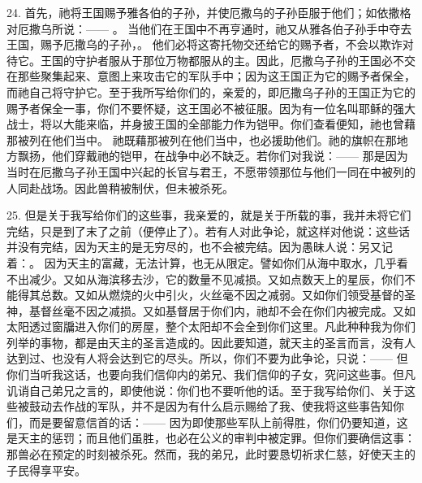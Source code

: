 24. 首先，祂将王国赐予雅各伯的子孙，并使厄撒乌的子孙臣服于他们；如依撒格对厄撒乌所说：—— 。 当他们在王国中不再亨通时，祂又从雅各伯子孙手中夺去王国，赐予厄撒乌的子孙，。 他们必将这寄托物交还给它的赐予者，不会以欺诈对待它。王国的守护者服从于那位万物都服从的主。因此，厄撒乌子孙的王国必不交在那些聚集起来、意图上来攻击它的军队手中；因为这王国正为它的赐予者保全，而祂自己将守护它。至于我所写给你们的，亲爱的，即厄撒乌子孙的王国正为它的赐予者保全一事，你们不要怀疑，这王国必不被征服。因为有一位名叫耶稣的强大战士，将以大能来临，并身披王国的全部能力作为铠甲。你们查看便知，祂也曾藉那被列在他们当中。 祂既藉那被列在他们当中，也必援助他们。祂的旗帜在那地方飘扬，他们穿戴祂的铠甲，在战争中必不缺乏。若你们对我说：—— 那是因为当时在厄撒乌子孙王国中兴起的长官与君王，不愿带领那位与他们一同在中被列的人同赴战场。因此兽稍被制伏，但未被杀死。\par

25. 但是关于我写给你们的这些事，我亲爱的，就是关于所载的事，我并未将它们完结，只是到了末了之前（便停止了）。若有人对此争论，就这样对他说：这些话并没有完结，因为天主的是无穷尽的，也不会被完结。因为愚昧人说：另又记着：。 因为天主的富藏，无法计算，也无从限定。譬如你们从海中取水，几乎看不出减少。又如从海滨移去沙，它的数量不见减损。又如点数天上的星辰，你们不能得其总数。又如从燃烧的火中引火，火丝毫不因之减弱。又如你们领受基督的圣神，基督丝毫不因之减损。又如基督居于你们内，祂却不会在你们内被完成。又如太阳透过窗牖进入你们的房屋，整个太阳却不会全到你们这里。凡此种种我为你们列举的事物，都是由天主的圣言造成的。因此要知道，就天主的圣言而言，没有人达到过、也没有人将会达到它的尽头。所以，你们不要为此争论，只说：—— 但你们当听我这话，也要向我们信仰内的弟兄、我们信仰的子女，究问这些事。但凡讥诮自己弟兄之言的，即使他说：你们也不要听他的话。至于我写给你们、关于这些被鼓动去作战的军队，并不是因为有什么启示赐给了我、使我将这些事告知你们，而是要留意信首的话：—— 因为即使那些军队上前得胜，你们仍要知道，这是天主的惩罚；而且他们虽胜，也必在公义的审判中被定罪。但你们要确信这事：那兽必在预定的时刻被杀死。然而，我的弟兄，此时要恳切祈求仁慈，好使天主的子民得享平安。\par

